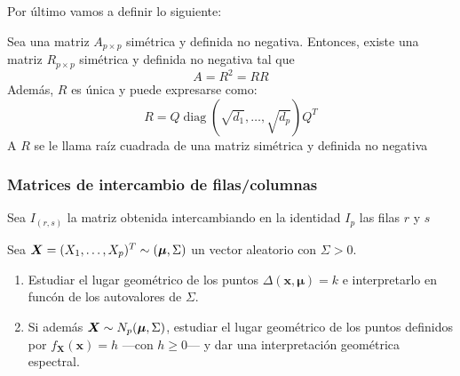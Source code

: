 Por último vamos a definir lo siguiente:
\begin{ndef}

  Sea una matriz $A_{p\times p}$ simétrica y definida no negativa. Entonces, existe una matriz $R_{p\times p}$ simétrica y definida no negativa tal que
  \[
  A = R^2 = RR
  \]
  Además, $R$ es única y puede expresarse como:
  \[
  R = Q \operatorname{diag}(\sqrt{d_1}, \dots, \sqrt{d_p}) Q^T
  \]
  A $R$  se le llama raíz cuadrada de una matriz simétrica y definida no negativa
\end{ndef}


\subsubsection{Matrices de intercambio de filas/columnas}

Sea $I_{(r,s)}$ la matriz obtenida intercambiando en la identidad $I_p$ las filas $r$ y $s$



\begin{ejer}
  Sea $\boldsymbol{X} = (X_1, \dots, X_p)^T \sim (\boldsymbol \mu, \Sigma)$ un vector aleatorio con $\Sigma > 0$. \begin{enumerate}
    \item Estudiar el lugar geométrico de los puntos $\Delta(\boldsymbol x, \boldsymbol \mu) = k$ e interpretarlo en funcón de los autovalores de $\Sigma$.
    \item Si además $\boldsymbol{X} \sim N_p(\boldsymbol \mu, \Sigma)$, estudiar el lugar geométrico de los puntos definidos por $f_{\boldsymbol X}(\boldsymbol x) = h$ —con $h \geq 0$— y dar una interpretación geométrica espectral.
  \end{enumerate}
\end{ejer}

